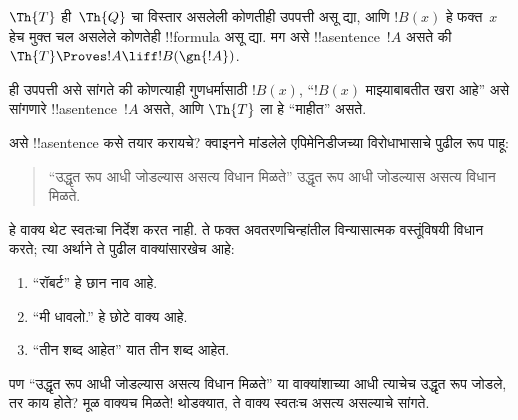 \documentclass[../../../include/open-logic-section]{subfiles}
\begin{document}
\begin{lem}
$\Th{T}$ ही~$\Th{Q}$ चा विस्तार असलेली कोणतीही उपपत्ती
असू द्या, आणि $!B(x)$ हे फक्त~$x$ हेच मुक्त चल असलेले
कोणतेही !!{formula} असू द्या. मग असे
!!a{sentence}~$!A$ असते की
$\Th{T} \Proves!A \liff !B(\gn{!A})$.
\end{lem}

ही उपपत्ती असे सांगते की कोणत्याही गुणधर्मासाठी $!B(x)$,
“$!B(x)$ माझ्याबाबतीत खरा आहे” असे सांगणारे
!!a{sentence}~$!A$ असते, आणि $\Th{T}$ ला हे
“माहीत” असते.

असे !!a{sentence} कसे तयार करायचे? क्वाइनने मांडलेले
एपिमेनिडीजच्या विरोधाभासाचे पुढील रूप पाहू:
\begin{quote}
“उद्धृत रूप आधी जोडल्यास असत्य विधान मिळते” उद्धृत रूप
आधी जोडल्यास असत्य विधान मिळते.
\end{quote}
हे वाक्य थेट स्वतःचा निर्देश करत नाही. ते फक्त अवतरणचिन्हांतील
विन्यासात्मक वस्तूंविषयी विधान करते; त्या अर्थाने ते
पुढील वाक्यांसारखेच आहे:
\begin{enumerate}
\item “रॉबर्ट” हे छान नाव आहे.
\item “मी धावलो.” हे छोटे वाक्य आहे.
\item “तीन शब्द आहेत” यात तीन शब्द आहेत.
\end{enumerate}
पण “उद्धृत रूप आधी जोडल्यास असत्य विधान मिळते” या
वाक्यांशाच्या आधी त्याचेच उद्धृत रूप जोडले, तर काय होते?
मूळ वाक्यच मिळते!{} थोडक्यात, ते वाक्य स्वतःच असत्य
असल्याचे सांगते.
\end{document}
